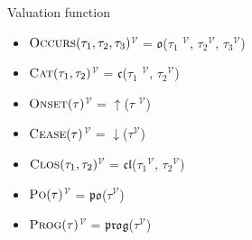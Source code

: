 \begin{defn}Valuation function
	\begin{itemize}
		\item  \textlbrackdbl $\textsc{Occurs}(\tau_1, \tau_2, \tau_3)$\textrbrackdbl$^{\mathcal{V}}$
		      = $\mathfrak{o}$(\textlbrackdbl $\tau_1$ \textrbrackdbl$^{\mathcal{V}}$,
		      \textlbrackdbl $\tau_2$\textrbrackdbl$^{\mathcal{V}}$, \textlbrackdbl $\tau_3$\textrbrackdbl$^{\mathcal{V}}$)

		\item  \textlbrackdbl $\textsc{Cat}(\tau_1, \tau_2)$\textrbrackdbl$^{\mathcal{V}}$
		      = $\mathfrak{c}$(\textlbrackdbl $\tau_1$ \textrbrackdbl$^{\mathcal{V}}$,
		      \textlbrackdbl $\tau_2$\textrbrackdbl$^{\mathcal{V}}$)
		\item \textlbrackdbl $\textsc{Onset}(\tau)$\textrbrackdbl$^{\mathcal{V}}$
		      = $\uparrow$(\textlbrackdbl $\tau$ \textrbrackdbl$^{\mathcal{V}}$)

		\item \textlbrackdbl $\textsc{Cease}(\tau)$\textrbrackdbl$^{\mathcal{V}}$
		      = $\downarrow$(\textlbrackdbl $\tau$\textrbrackdbl$^{\mathcal{V}}$)
		\item \textlbrackdbl $\textsc{Clos}(\tau_1, \tau_2)$\textrbrackdbl$^{\mathcal{V}}$
		      = $\mathfrak{cl}$(\textlbrackdbl $\tau_1$\textrbrackdbl$^{\mathcal{V}}$,
		      \textlbrackdbl $\tau_2$\textrbrackdbl$^{\mathcal{V}}$)
		\item \textlbrackdbl $\textsc{Po}(\tau)$\textrbrackdbl$^{\mathcal{V}}$
		      = $\mathfrak{po}$(\textlbrackdbl $\tau$\textrbrackdbl$^{\mathcal{V}}$)
		\item \textlbrackdbl $\textsc{Prog}(\tau)$\textrbrackdbl$^{\mathcal{V}}$
		      = $\mathfrak{prog}$(\textlbrackdbl $\tau$\textrbrackdbl$^{\mathcal{V}}$)

	\end{itemize}
\end{defn}
